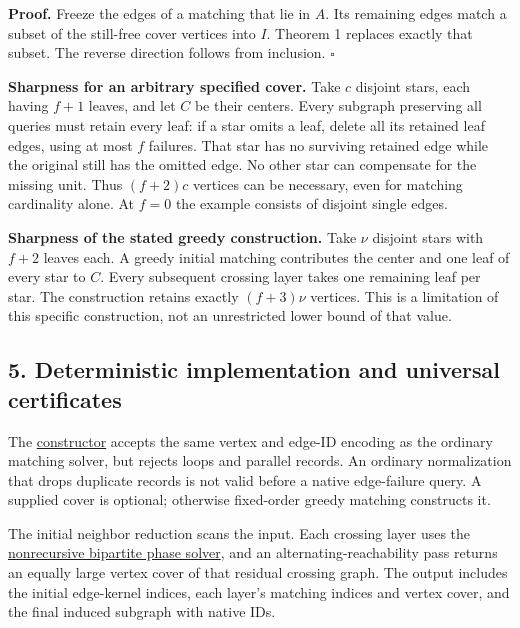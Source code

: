 \textbf{Proof.} Freeze the edges of a matching that lie in \(A\). Its remaining edges match a subset of the still-free cover vertices into \(I\). Theorem 1 replaces exactly that subset. The reverse direction follows from inclusion. \hfill\(\square\)

\textbf{Sharpness for an arbitrary specified cover.} Take \(c\) disjoint stars, each having \(f+1\) leaves, and let \(C\) be their centers. Every subgraph preserving all queries must retain every leaf: if a star omits a leaf, delete all its retained leaf edges, using at most \(f\) failures. That star has no surviving retained edge while the original still has the omitted edge. No other star can compensate for the missing unit. Thus \((f+2)c\) vertices can be necessary, even for matching cardinality alone. At \(f=0\) the example consists of disjoint single edges.

\textbf{Sharpness of the stated greedy construction.} Take \(\nu\) disjoint stars with \(f+2\) leaves each. A greedy initial matching contributes the center and one leaf of every star to \(C\). Every subsequent crossing layer takes one remaining leaf per star. The construction retains exactly \((f+3)\nu\) vertices. This is a limitation of this specific construction, not an unrestricted lower bound of that value.

\hypertarget{af-321c79486f-deterministic-implementation-and-universal-certificates}{%
\subsection{5. Deterministic implementation and universal certificates}\label{af-321c79486f-deterministic-implementation-and-universal-certificates}}

The \href{https://github.com/icekylinx/algorithm-frontier/blob/main/problems/general-matching/reference/failure_kernel.py}{constructor} accepts the same vertex and edge-ID encoding as the ordinary matching solver, but rejects loops and parallel records. An ordinary normalization that drops duplicate records is not valid before a native edge-failure query. A supplied cover is optional; otherwise fixed-order greedy matching constructs it.

The initial neighbor reduction scans the input. Each crossing layer uses the \href{https://github.com/icekylinx/algorithm-frontier/blob/main/problems/general-matching/reference/bipartite-proof.md}{nonrecursive bipartite phase solver}, and an alternating-reachability pass returns an equally large vertex cover of that residual crossing graph. The output includes the initial edge-kernel indices, each layer's matching indices and vertex cover, and the final induced subgraph with native IDs.

